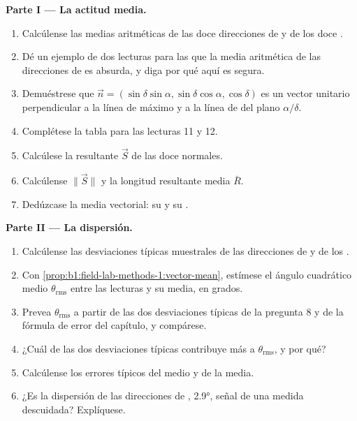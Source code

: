 \begin{problem}
\medskip
\noindent\textbf{Parte I --- La actitud media.}
\begin{enumerate}
  \item Calcúlense las medias aritméticas de las doce direcciones de  y de los doce .
  \item Dé un ejemplo de dos lecturas para las que la media aritmética de las direcciones de  es
        absurda, y diga por qué aquí es segura.
  \item Demuéstrese que $\vec n = (\sin\delta\sin\alpha, \sin\delta\cos\alpha,
        \cos\delta)$ es un vector unitario perpendicular a la línea de máximo  y a la
        línea de  del plano $\alpha/\delta$.
  \item Complétese la tabla para las lecturas 11 y 12.
  \item Calcúlese la resultante $\vec S$ de las doce normales.
  \item Calcúlense $\|\vec S\|$ y la longitud resultante media $\bar R$.
  \item Dedúzcase la media vectorial: su  y su .
\end{enumerate}

\medskip
\noindent\textbf{Parte II --- La dispersión.}
\begin{enumerate}[resume]
  \item Calcúlense las desviaciones típicas muestrales de las direcciones de  y de los .
  \item Con \cref{prop:b1:field-lab-methods-1:vector-mean}, estímese el ángulo cuadrático medio
        $\theta_{\text{rms}}$ entre las lecturas y su media, en grados.
  \item Prevea $\theta_{\text{rms}}$ a partir de las dos desviaciones típicas de la pregunta 8 y de la fórmula
        de error del capítulo, y compárese.
  \item ¿Cuál de las dos desviaciones típicas contribuye más a $\theta_{\text{rms}}$, y por qué?
  \item Calcúlense los errores típicos del  medio y de la  media.
  \item ¿Es la dispersión de las direcciones de , \ang{2.9}, señal de una medida descuidada?
        Explíquese.
\end{enumerate}


\end{problem}
